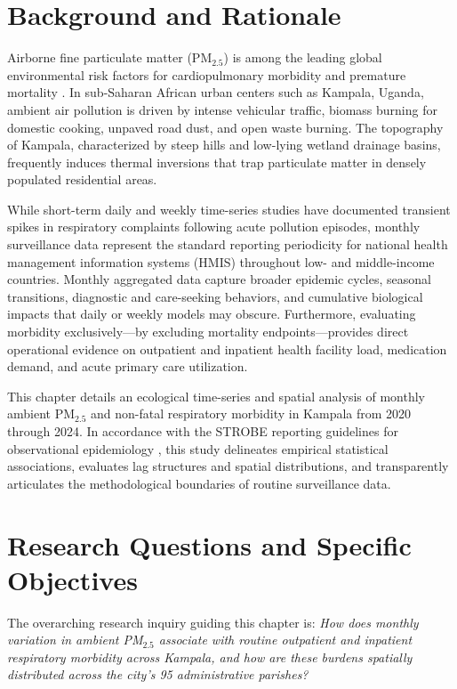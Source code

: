 \documentclass[12pt,a4paper]{report}
\newcommand{\pmfive}{PM$_{2.5}$}
\begin{document}
\section{Background and Rationale}
Airborne fine particulate matter (\pmfive{}) is among the leading global environmental risk factors for cardiopulmonary morbidity and premature mortality \parencite{WHO2021}. In sub-Saharan African urban centers such as Kampala, Uganda, ambient air pollution is driven by intense vehicular traffic, biomass burning for domestic cooking, unpaved road dust, and open waste burning. The topography of Kampala, characterized by steep hills and low-lying wetland drainage basins, frequently induces thermal inversions that trap particulate matter in densely populated residential areas.

While short-term daily and weekly time-series studies have documented transient spikes in respiratory complaints following acute pollution episodes, monthly surveillance data represent the standard reporting periodicity for national health management information systems (HMIS) throughout low- and middle-income countries. Monthly aggregated data capture broader epidemic cycles, seasonal transitions, diagnostic and care-seeking behaviors, and cumulative biological impacts that daily or weekly models may obscure. Furthermore, evaluating morbidity exclusively---by excluding mortality endpoints---provides direct operational evidence on outpatient and inpatient health facility load, medication demand, and acute primary care utilization.

This chapter details an ecological time-series and spatial analysis of monthly ambient \pmfive{} and non-fatal respiratory morbidity in Kampala from 2020 through 2024. In accordance with the STROBE reporting guidelines for observational epidemiology \parencite{vonElm2007}, this study delineates empirical statistical associations, evaluates lag structures and spatial distributions, and transparently articulates the methodological boundaries of routine surveillance data.

\section{Research Questions and Specific Objectives}
The overarching research inquiry guiding this chapter is: \emph{How does monthly variation in ambient \pmfive{} associate with routine outpatient and inpatient respiratory morbidity across Kampala, and how are these burdens spatially distributed across the city's 95 administrative parishes?}
\end{document}
